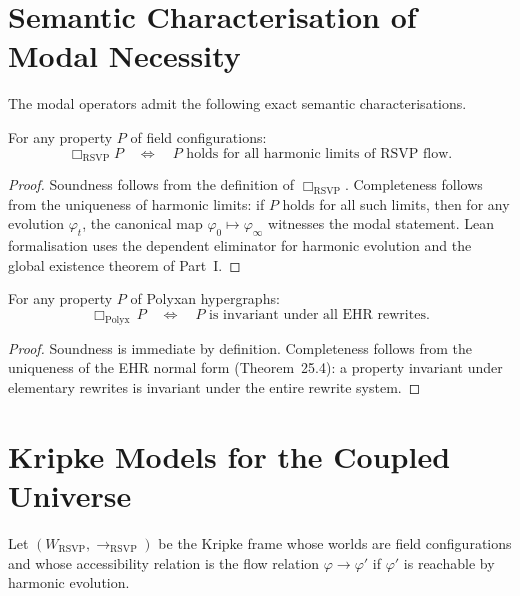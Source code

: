 
\section{Semantic Characterisation of Modal Necessity}
\label{sec:modal-semantics}

The modal operators admit the following exact semantic characterisations.

\begin{theorem}
For any property $P$ of field configurations:
\[
\Box_{\mathrm{RSVP}} P
\quad\Longleftrightarrow\quad
\text{$P$ holds for all harmonic limits of RSVP flow}.
\]
\end{theorem}

\begin{proof}
Soundness follows from the definition of $\Box_{\mathrm{RSVP}}$.
Completeness follows from the uniqueness of harmonic limits:
if $P$ holds for all such limits, then for any evolution $\varphi_t$,
the canonical map $\varphi_0\mapsto\varphi_\infty$ witnesses the modal
statement.
Lean formalisation uses the dependent eliminator for harmonic evolution
and the global existence theorem of Part~I.
\end{proof}

\begin{theorem}
For any property $P$ of Polyxan hypergraphs:
\[
\Box_{\mathrm{Polyx}}\,P
\quad\Longleftrightarrow\quad
\text{$P$ is invariant under all EHR rewrites}.
\]
\end{theorem}

\begin{proof}
Soundness is immediate by definition.
Completeness follows from the uniqueness of the EHR normal form
(Theorem~25.4): a property invariant under elementary rewrites is
invariant under the entire rewrite system.
\end{proof}



\section{Kripke Models for the Coupled Universe}
\label{sec:kripke}

Let $(W_{\mathrm{RSVP}},\to_{\mathrm{RSVP}})$ be the Kripke frame whose
worlds are field configurations and whose accessibility relation is the
flow relation $\varphi\to\varphi'$ if $\varphi'$ is reachable by harmonic
evolution.

